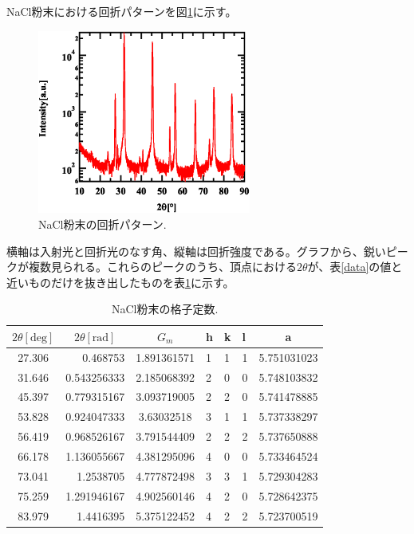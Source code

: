 \documentclass[11pt,a4j,uplatex]{jsarticle}
\begin{document}
NaCl粉末における回折パターンを図\ref{powder}に示す。

\begin{figure}[htb]
 \centering
 \includegraphics[clip,width=7cm]{FigPowder.eps}
 \caption{NaCl粉末の回折パターン.}
 \label{powder}
\end{figure}

横軸は入射光と回折光のなす角、縦軸は回折強度である。グラフから、鋭いピークが複数見られる。これらのピークのうち、頂点における$2\theta$が、表\ref{data}の値と近いものだけを抜き出したものを表\ref{pow}に示す。

\begin{table}[htbp]
 \begin{center}
  \caption{NaCl粉末の格子定数.}
  \begin{tabular}{|c|r|c|lll|c|}  \hline
   $2\theta[\mathrm{deg}]$ & \multicolumn{1}{c|}{$2\theta[\mathrm{rad}]$} & $G_{m}$     & h & k & l & a           \\ \hline  \hline
   27.306                  & 0.468753                                     & 1.891361571 & 1 & 1 & 1 & 5.751031023 \\
   31.646                  & 0.543256333                                  & 2.185068392 & 2 & 0 & 0 & 5.748103832 \\
   45.397                  & 0.779315167                                  & 3.093719005 & 2 & 2 & 0 & 5.741478885 \\
   53.828                  & 0.924047333                                  & 3.63032518  & 3 & 1 & 1 & 5.737338297 \\
   56.419                  & 0.968526167                                  & 3.791544409 & 2 & 2 & 2 & 5.737650888 \\
   66.178                  & 1.136055667                                  & 4.381295096 & 4 & 0 & 0 & 5.733464524 \\
   73.041                  & 1.2538705                                    & 4.777872498 & 3 & 3 & 1 & 5.729304283 \\
   75.259                  & 1.291946167                                  & 4.902560146 & 4 & 2 & 0 & 5.728642375 \\
   83.979                  & 1.4416395                                    & 5.375122452 & 4 & 2 & 2 & 5.723700519 \\  \hline
  \end{tabular}
  \label{pow}
 \end{center}
\end{table}
\end{document}
